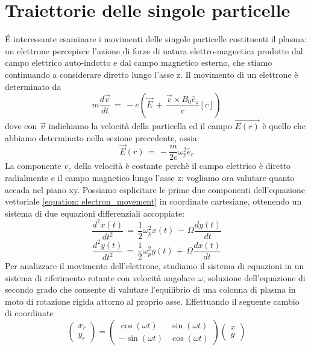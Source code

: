 \section{Traiettorie delle singole particelle}

\'E interessante esaminare i movimenti delle singole particelle costituenti il plasma: un elettrone percepisce l'azione di 
forze di natura elettro-magnetica prodotte dal campo elettrico auto-indotto e dal campo magnetico esterno, che stiamo continuando 
a considerare diretto lungo l'asse z. Il movimento di un elettrone è determinato da
\begin{equation}
    m\frac{d\vec{v}}{dt}\,=\,-e\left(\vec{E}\,+\,\frac{\vec{v} \times B_0 \hat{e}_z}{c}\left[c\right]\right)
    \label{equation: electron_movement}
\end{equation}
dove con $\vec{v}$ indichiamo la velocità della particella ed il campo $\vec{E\left(r\right)}$ è quello che abbiamo determinato 
nella sezione precedente, ossia:
\begin{equation}
    \vec{E}\left(r\right)\,=\,-\frac{m}{2e}\omega_p^2 \hat{e}_r
\end{equation}
La componente $v_z$ della velocità è costante perchè il campo elettrico è diretto radialmente e il campo magnetico lungo l'asse z: 
vogliamo ora valutare quanto accada nel piano xy. Possiamo esplicitare le prime due componenti dell'equazione vettoriale \eqref{equation: electron_movement} 
in coordinate cartesiane, ottenendo un sistema di due equazioni differenziali accoppiate:
\begin{equation}
    \frac{d^2 x\left(t\right)}{dt^2}\,=\,\frac{1}{2}\omega_p^2 x\left(t\right)\,-\,\Omega \frac{dy\left(t\right)}{dt}
    \label{equation: xcomp_singlepart}
\end{equation}
\begin{equation}
    \frac{d^2 y\left(t\right)}{dt^2}\,=\,\frac{1}{2}\omega_p^2 y\left(t\right)\,+\,\Omega \frac{dx\left(t\right)}{dt}
    \label{equation: ycomp_singlepart}
\end{equation}
Per analizzare il movimento dell'elettrone, studiamo il sistema di equazioni in un sistema di riferimento rotante con velocità 
angolare $\omega$, soluzione dell'equazione di secondo grado che consente di valutare l'equilibrio di una colonna di plasma in 
moto di rotazione rigida attorno al proprio asse. Effettuando il seguente cambio di coordinate 
\begin{equation}
    \begin{pmatrix}
        x_r \\
        y_r 
    \end{pmatrix}
    =
    \begin{pmatrix}
        \cos{\left(\omega t\right)} & \sin\left(\omega t\right) \\
        -\sin{\left(\omega t\right)} & \cos{\left(\omega t\right)}
    \end{pmatrix}
    \begin{pmatrix}
        x   \\
        y
    \end{pmatrix}
    \label{equation: change_coord}
\end{equation}    
